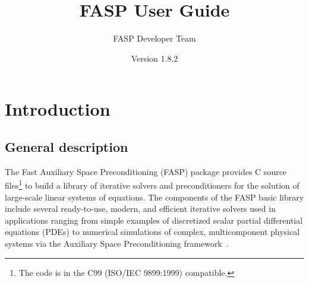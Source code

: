 \documentclass[11pt]{memoir}
\title{\Huge FASP User Guide}
\author{FASP Developer Team}
\date{\vfill Version 1.8.2} %
\begin{document}
\clearpage\maketitle
\thispagestyle{empty}

\newpage
\setcounter{page}{1}
\tableofcontents

\chapter{Introduction}\label{ch:intro}




\section{General description}
The Fast Auxiliary Space Preconditioning (FASP) package provides
C source files\footnote{The code is in the C99 (ISO/IEC 9899:1999) compatible.} to build a library of
iterative solvers and preconditioners for the solution of large-scale
linear systems of equations.  The components of the FASP basic library
include several ready-to-use, modern, and efficient iterative solvers
used in applications ranging from simple examples of discretized
scalar partial differential equations (PDEs) to numerical simulations
of complex, multicomponent physical systems via the Auxiliary Space
Preconditioning framework~\cite{Xu.Xu.2010ff}.
\end{document}
